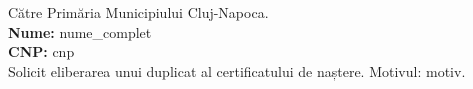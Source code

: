 \documentclass[11pt]{article}
\begin{document}
Către Primăria Municipiului Cluj-Napoca.\\[0.3cm]
\textbf{Nume:} {{nume_complet}}\\
\textbf{CNP:} {{cnp}}\\[0.2cm]
Solicit eliberarea unui duplicat al certificatului de naștere. Motivul: {{motiv}}.
\signatureblock
\end{document}
